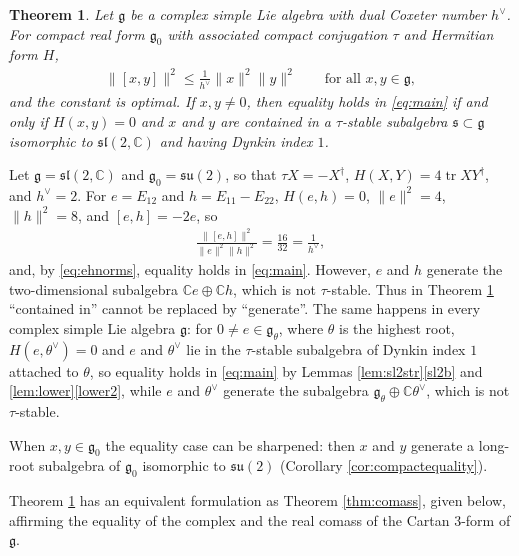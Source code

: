 \documentclass[leqno,10pt]{amsart}
\newtheorem{theorem}{Theorem}[section]
\theoremstyle{definition}
\numberwithin{equation}{section}
\newcommand{\su}{\mathfrak{su}}
\newcommand{\sll}{\mathfrak{sl}}
\newcommand{\g}{\mathfrak{g}}
\newcommand{\com}{\mathbb C}
\newcommand{\tr}{\operatorname{tr}}
\newcommand{\gz}{\g_{0}}
\newcommand{\hv}{h^\vee}
\newcommand{\norm}[1]{\lVert #1\rVert}
\newcommand{\subs}{\mathfrak{s}}
\begin{document}
\begin{theorem}\label{thm:A}
Let $\g$ be a complex simple Lie algebra with dual Coxeter number $\hv$. For compact real form $\gz$ with associated compact conjugation $\tau$ and Hermitian form $H$,%
\begin{align}\label{eq:main}
\norm{[x,y]}^{2} \leq \frac{1}{h^\vee}\norm{x}^{2}\norm{y}^{2} \qquad \text{for all}\,\, x, y \in \g,
\end{align}
and the constant is optimal. If $x, y \neq 0$, then equality holds in \eqref{eq:main} if and only if $H(x, y) = 0$ and $x$ and $y$ are contained in a $\tau$-stable subalgebra $\subs \subset \g$ isomorphic to $\sll(2, \com)$ and having Dynkin index $1$.
\end{theorem}


\begin{example}\label{ex:eh}
Let $\g = \sll(2, \com)$ and $\gz = \su(2)$, so that $\tau X = -X^{\dagger}$, $H(X, Y) = 4\tr XY^{\dagger}$, and $\hv = 2$. For $e = E_{12}$ and $h = E_{11} - E_{22}$, $H(e, h) = 0$, $\norm{e}^{2} = 4$, $\norm{h}^{2} = 8$, and $[e, h] = -2e$, so
\begin{align}\label{eq:ehnorms}
\frac{\norm{[e, h]}^{2}}{\norm{e}^{2}\norm{h}^{2}} = \frac{16}{32} = \frac{1}{\hv},
\end{align}
and, by \eqref{eq:ehnorms}, equality holds in \eqref{eq:main}. However, $e$ and $h$ generate the two-dimensional subalgebra $\com e \oplus \com h$, which is not $\tau$-stable. Thus in Theorem \ref{thm:A} ``contained in'' cannot be replaced by ``generate''. The same happens in every complex simple Lie algebra $\g$: for $0 \neq e \in \g_{\theta}$, where $\theta$ is the highest root, $H(e, \theta^{\vee}) = 0$ and $e$ and $\theta^{\vee}$ lie in the $\tau$-stable subalgebra of Dynkin index $1$ attached to $\theta$, so equality holds in \eqref{eq:main} by Lemmas \ref{lem:sl2str}\ref{sl2b} and \ref{lem:lower}\ref{lower2}, while $e$ and $\theta^{\vee}$ generate the subalgebra $\g_{\theta} \oplus \com\theta^{\vee}$, which is not $\tau$-stable.
\end{example}

When $x, y \in \gz$ the equality case can be sharpened: then $x$ and $y$ generate a long-root subalgebra of $\gz$ isomorphic to $\su(2)$ (Corollary \ref{cor:compactequality}). 

Theorem \ref{thm:A} has an equivalent formulation as Theorem \ref{thm:comass}, given below, affirming the equality of the complex and the real comass of the Cartan $3$-form of $\g$.
\end{document}
